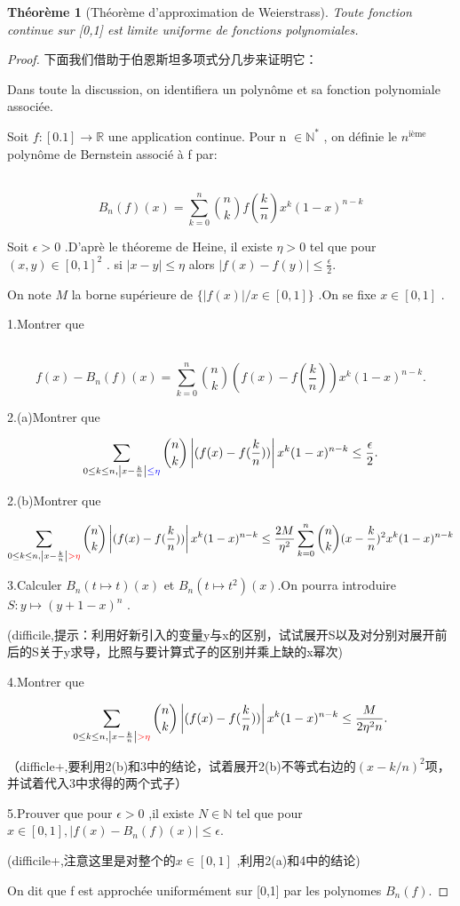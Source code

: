 \documentclass[12pt]{book}
\theoremstyle{definition}\newtheorem{dfn}{Définition}[chapter]
\theoremstyle{plain}\newtheorem{thm}{Théorème}[chapter]
\theoremstyle{plain}\newtheorem{prp}{Proposition}[chapter]
\theoremstyle{plain}\newtheorem{lem}{\bf Lemme}[chapter]
\theoremstyle{plain}\newtheorem{axm}{\bf Axiome}[chapter]
\theoremstyle{plain}\newtheorem{lmm}{\bf Lemme}[chapter]
\theoremstyle{plain}\newtheorem{cor}{\bf Corollaire}[chapter]
\theoremstyle{remark}\newtheorem{rem}{Remarque}[chapter]
\begin{document}
\begin{thm}[Théorème d'approximation de Weierstrass]
Toute fonction continue sur [0,1] est limite uniforme de fonctions polynomiales. 
\end{thm}
\begin{proof}
下面我们借助于伯恩斯坦多项式分几步来证明它：

Dans toute la discussion, on identifiera un polynôme et sa fonction polynomiale associée.

Soit  $f: [0.1] \rightarrow \mathbb{R}$ une application continue. Pour n $\in \mathbb N ^{*}$ , on définie le $n^{\text{ième}}$  polynôme de Bernstein associé à f par:

​$$\boxed{B_{n}(f)(x) = \sum_{k=0}^{n}\binom{n}{k}f(\frac{k}{n})x^k(1-x)^{n-k}}$$ 

Soit $\epsilon > 0$ .D'aprè le théoreme de Heine, il existe $\eta > 0$ tel que pour $(x,y) \in [0,1]^2$ . si $\left | x-y \right | \le\eta$  alors       $\left | f(x)-f(y) \right | \le\frac{\epsilon}{2}.$  

On note $M$  la borne supérieure de $\{\left |f(x)\right| / x\in [0,1]\}$ .On se fixe $x\in [0,1]$ .


1.Montrer que 

​ $$f(x)-B_{n}(f)(x) = \sum_{k=0}^{n}\binom{n}{k}(f(x)-f(\frac{k}{n}))x^k(1-x)^{n-k}.$$



2.(a)Montrer que

$$\sum_{0\le k\le n, \left | x-\frac{k}{n} \right | \color{blue}{\le}\eta}\binom{n}{k}\left|(f(x)-f(\frac{k}{n}))\right|x^k(1-x)^{n-k}\le\frac{\epsilon}{2}.$$ 

​2.(b)Montrer que 

$$\sum_{0\le k\le n, \left | x-\frac{k}{n} \right | \color{red}{>}\eta}\binom{n}{k}\left|(f(x)-f(\frac{k}{n}))\right|x^k(1-x)^{n-k}\le\frac{2M}{\eta^2}\sum_{k=0}^{n}\binom{n}{k}(x-\frac{k}{n})^2x^k(1-x)^{n-k}$$



3.Calculer $B_{n}(t\mapsto t)(x)$ et $B_{n}(t\mapsto t^2)(x)$.On pourra introduire $S:  y\mapsto (y+1-x)^n$ .

(difficile,提示：利用好新引入的变量y与x的区别，试试展开S以及对分别对展开前后的S关于y求导，比照与要计算式子的区别并乘上缺的x幂次)

4.Montrer que 

$$\sum_{0\le k\le n, \left | x-\frac{k}{n} \right | \color{red}{>}\eta}\binom{n}{k}\left|(f(x)-f(\frac{k}{n}))\right|x^k(1-x)^{n-k}\le\frac{M}{2\eta^2 n}.$$

（difficle+,要利用2(b)和3中的结论，试着展开2(b)不等式右边的$(x-k/n)^2$项，并试着代入3中求得的两个式子）

5.Prouver que pour $\epsilon>0$ ,il existe $N\in \mathbb N$ tel que pour $x\in [0,1],\left|f(x)-B_{n}(f)(x)\right|\le \epsilon.$

(difficile+,注意这里是对整个的$x\in[0,1]$ ,利用2(a)和4中的结论)

On dit que f est approchée uniformément sur [0,1] par les polynomes $B_{n}(f)$.
\end{proof}
\end{document}
